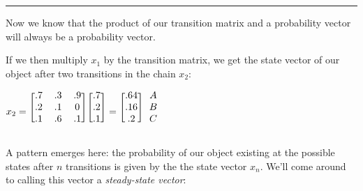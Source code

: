 \documentclass{article}
\begin{document}
\rule{\textwidth}{0.5pt}

Now we know that the product of our transition matrix and a probability vector will always be a probability vector.

\noindent If we then multiply $x_1$ by the transition matrix, we get the state vector of our object after two transitions in the chain $x_2$: 

\begin{center}
    $x_2 = 
    \begin{blockarray}{ccc}
        \begin{block}{[ccc]} 
            .7&.3&.9\\
            .2&.1& 0\\
            .1&.6&.1\\ 
        \end{block}
    \end{blockarray}
    \begin{blockarray}{c}
        \begin{block}{[c]} 
            .7\\
            .2\\
            .1\\ 
        \end{block}
    \end{blockarray}
    =
    \begin{blockarray}{cc}
        \begin{block}{[c]c} 
            .64 & A\\
            .16 & B\\
            .2 & C\\ 
        \end{block}
    \end{blockarray}
    $
\end{center}

\noindent A pattern emerges here: the probability of our object existing at the possible states after $n$ transitions is given by the the state vector $x_n$. We'll come around to calling this vector a \textit{steady-state vector}:
\end{document}
